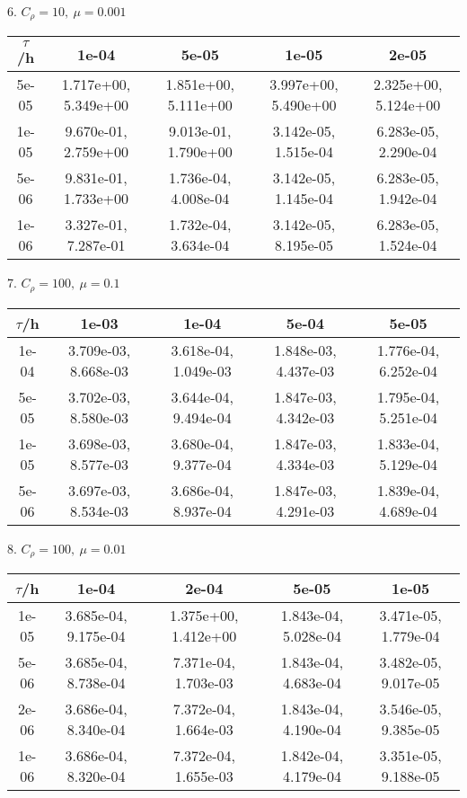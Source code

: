 6. $C_{\rho} = 10, \ \mu = 0.001$
\begin{center}
	\begin{tabular}{|c|c|c|c|c|} 
		\hline
		$\tau$/h & 1e-04 & 5e-05 & 1e-05 & 2e-05 \\ 
		\hline
		5e-05 & 1.717e+00,  5.349e+00 & 1.851e+00,  5.111e+00 & 3.997e+00,  5.490e+00 & 2.325e+00,  5.124e+00\\ 
		\hline
		1e-05 & 9.670e-01,  2.759e+00 & 9.013e-01,  1.790e+00 & 3.142e-05,  1.515e-04 & 6.283e-05,  2.290e-04\\ 
		\hline
		5e-06 & 9.831e-01,  1.733e+00 & 1.736e-04,  4.008e-04 & 3.142e-05,  1.145e-04 & 6.283e-05,  1.942e-04\\ 
		\hline
		1e-06 & 3.327e-01,  7.287e-01 & 1.732e-04,  3.634e-04 & 3.142e-05,  8.195e-05 & 6.283e-05, 1.524e-04\\ 
		\hline
	\end{tabular}
\end{center}

7. $C_{\rho} = 100, \ \mu = 0.1$
\begin{center}
	\begin{tabular}{|c|c|c|c|c|} 
		\hline
		$\tau$/h & 1e-03 & 1e-04 & 5e-04 & 5e-05 \\ 
		\hline
		1e-04 & 3.709e-03,  8.668e-03 & 3.618e-04,  1.049e-03 & 1.848e-03,  4.437e-03 & 1.776e-04,  6.252e-04\\ 
		\hline
		5e-05 & 3.702e-03,  8.580e-03 & 3.644e-04,  9.494e-04 & 1.847e-03,  4.342e-03 & 1.795e-04,  5.251e-04\\ 
		\hline
		1e-05 & 3.698e-03,  8.577e-03 & 3.680e-04,  9.377e-04 & 1.847e-03,  4.334e-03 & 1.833e-04,  5.129e-04\\ 
		\hline
		5e-06 & 3.697e-03,  8.534e-03 & 3.686e-04,  8.937e-04 & 1.847e-03,  4.291e-03 & 1.839e-04,  4.689e-04\\ 
		\hline
	\end{tabular}
\end{center}

8. $C_{\rho} = 100, \ \mu = 0.01$
\begin{center}
	\begin{tabular}{|c|c|c|c|c|} 
		\hline
		$\tau$/h & 1e-04 & 2e-04 & 5e-05 & 1e-05 \\ 
		\hline
		1e-05 & 3.685e-04,  9.175e-04 & 1.375e+00,  1.412e+00 & 1.843e-04,  5.028e-04 & 3.471e-05,  1.779e-04\\ 
		\hline
		5e-06 & 3.685e-04,  8.738e-04 & 7.371e-04,  1.703e-03 & 1.843e-04, 4.683e-04 & 3.482e-05, 9.017e-05\\ 
		\hline
		2e-06 & 3.686e-04,  8.340e-04 & 7.372e-04,  1.664e-03 & 1.843e-04,  4.190e-04 & 3.546e-05,  9.385e-05\\ 
		\hline
		1e-06 & 3.686e-04,  8.320e-04 & 7.372e-04, 1.655e-03 & 1.842e-04, 4.179e-04 & 3.351e-05, 9.188e-05\\ 
		\hline
	\end{tabular}
\end{center}


